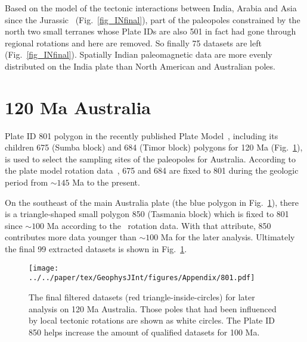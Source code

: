 Based on the model of the tectonic interactions between India, Arabia and Asia
since the Jurassic~\citep{G15} (Fig.~\ref{fig_INfinal}), part of the paleopoles
constrained by the north two small terranes whose Plate IDs are also 501 in fact
had gone through regional rotations and here are removed. So finally 75 datasets
are left (Fig.~\ref{fig_INfinal}). Spatially Indian paleomagnetic data are more
evenly distributed on the India plate than North American and Australian poles.

\section{120 Ma Australia}

Plate ID 801 polygon in the recently published Plate Model~\citep{Y18}, including
its children 675 (Sumba block) and 684 (Timor block) polygons for
120 Ma (Fig.~\ref{fig_AUfinal}), is used to select the sampling
sites of the paleopoles for Australia. According to the plate model rotation
data~\citep{Y18}, 675 and 684 are fixed to 801 during the geologic period from
${\sim}145$ Ma to the present.

On the southeast of the main Australia plate (the blue polygon in
Fig.~\ref{fig_AUfinal}), there is a triangle-shaped small polygon 850
(Tasmania block) which is fixed to 801 since ${\sim}100$ Ma according to
the~\citet{Y18} rotation data. With that attribute, 850 contributes more data
younger than ${\sim}100$ Ma for the later analysis. Ultimately the final 99 extracted
datasets is shown in Fig.~\ref{fig_AUfinal}.

\begin{figure}[!ht]
\texttt{[image: ../../paper/tex/GeophysJInt/figures/Appendix/801.pdf]}
\caption[Final filtered datasets for analysis on 120 Ma
Australia]{The final filtered datasets (red triangle-inside-circles) for later
analysis on 120 Ma Australia. Those poles that had been influenced
by local tectonic rotations are shown as white circles. The Plate ID 850 helps
increase the amount of qualified datasets for 100
Ma.}\label{fig_AUfinal}
\end{figure}

